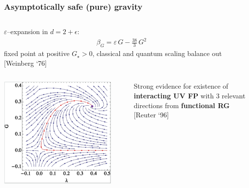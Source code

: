 \documentclass[]{beamer}  %
\begin{document}
\begin{frame}
  \frametitle{Asymptotically safe (pure) gravity }

  \begin{columns}[T]
    \begin{column}{.6\textwidth}
      \begin{center}
        $\varepsilon$--expansion in $d=2+\epsilon$:
        \begin{align*}
          \boxed{
            \beta_G = \varepsilon \, G - \frac{38}{3} \, G^2
          }
        \end{align*}
        fixed point at positive $G_\star > 0$, classical
        and quantum scaling balance out [Weinberg `76]
      \end{center}
    \end{column}
    \begin{column}{.4\textwidth}
      \begin{center}
        
      \end{center}
    \end{column}
  \end{columns}

  \begin{columns}[T]
    \begin{column}{.4\textwidth}
      \begin{center}
        \includegraphics[width=0.9\textwidth]{fixed_point_EH.png}
      \end{center}
    \end{column}
    \begin{column}{.6\textwidth}
      \begin{center}
        Strong evidence for existence of \textbf{interacting UV FP}
        with 3 relevant directions from \textbf{functional RG}\\[5pt]
        \hfill [Reuter `96]


\end{center}
\end{column}
\end{columns}
\end{frame}
\end{document}
